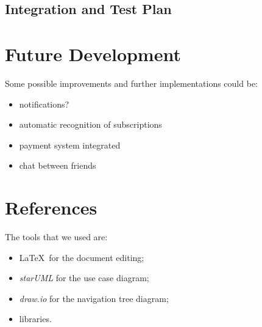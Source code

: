 \documentclass[11pt]{article}
\begin{document}
\subsection{Integration and Test Plan}

\newpage
\section{Future Development}\label{sec:dev}
Some possible improvements and further implementations could be:
\begin{itemize}
    \item notifications?
    \item automatic recognition of subscriptions
    \item payment system integrated
    \item chat between friends
\end{itemize}

\section{References}\label{sec:ref}
The tools that we used are:
\begin{itemize}
    \item \LaTeX\ for the document editing;
    \item \textit{starUML} for the use case diagram;
    \item \textit{draw.io} for the navigation tree diagram;
    \item libraries.
\end{itemize}
\end{document}
